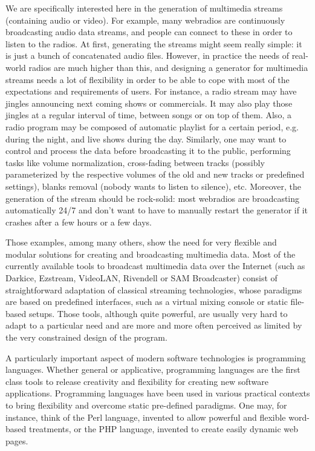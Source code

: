\documentclass{llncs}
\newcommand{\eg}{{e.g.}}
\begin{document}
We are specifically interested here in the generation of multimedia streams
(containing audio or video). For example, many webradios are continuously
broadcasting audio data streams, and people can connect to these in order to
listen to the radios. At first, generating the streams might seem really simple:
it is just a bunch of concatenated audio files. However, in practice the needs
of real-world radios are much higher than this, and designing a generator for
multimedia streams needs a lot of flexibility in order to be able to cope with
most of the expectations and requirements of users. For instance, a radio stream
may have jingles announcing next coming shows or commercials. It may also play
those jingles at a regular interval of time, between songs or on top of
them. Also, a radio program may be composed of automatic playlist for a certain
period, \eg{} during the night, and live shows during the day. Similarly, one
may want to control and process the data before broadcasting it to the public,
performing tasks like volume normalization, cross-fading between tracks
(possibly parameterized by the respective volumes of the old and new tracks or
predefined settings), blanks removal (nobody wants to listen to silence),
etc. Moreover, the generation of the stream should be rock-solid: most webradios
are broadcasting automatically 24/7 and don't want to have to manually restart
the generator if it crashes after a few hours or a few days.

Those examples, among many others, show the need for very flexible and modular
solutions for creating and broadcasting multimedia data. Most of the currently
available tools to broadcast multimedia data over the Internet (such as Darkice,
Ezstream, VideoLAN, Rivendell or SAM Broadcaster) consist of straightforward
adaptation of classical streaming technologies, whose paradigms are based on
predefined interfaces, such as a virtual mixing console or static file-based
setups. Those tools, although quite powerful, are usually very hard to adapt to
a particular need and are more and more often perceived as limited by the very
constrained design of the program.

A particularly important aspect of modern software technologies is programming
languages. Whether general or applicative, programming languages are the first 
class tools to release creativity and flexibility for creating new software applications.
Programming languages have been used in various practical contexts to bring flexibility
and overcome static pre-defined paradigms. One may, for instance, think of the Perl 
language, invented to allow powerful and flexible word-based treatments, or the PHP
language, invented to create easily dynamic web pages.
\end{document}
